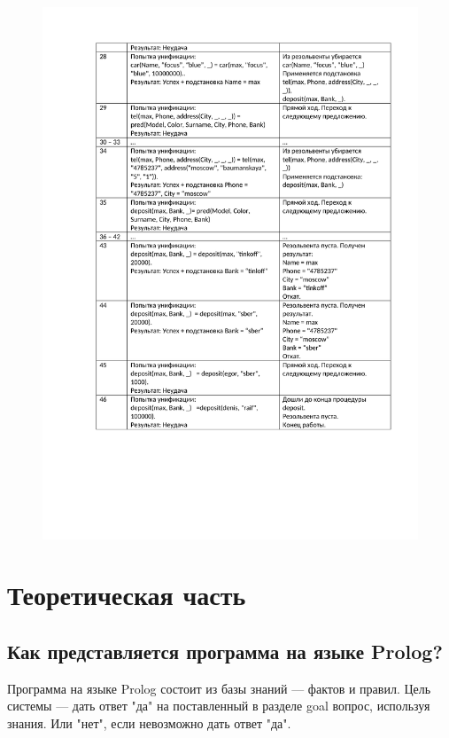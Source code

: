 \newpage
\begin{figure}[H]
	\begin{center}
		\includegraphics[scale=0.85]{img/13.2.pdf}
	\end{center}
\end{figure}


\section*{Теоретическая часть}

\subsection*{Как представляется программа на языке Prolog?}

Программа на языке Prolog состоит из базы знаний --- фактов и правил. Цель системы --- дать ответ "да"{} на поставленный в разделе goal вопрос, используя знания. Или "нет"{}, если невозможно дать ответ "да"{}.

